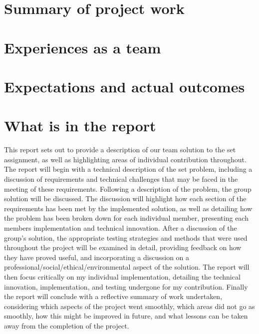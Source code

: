 \section{Summary of project work}

\section{Experiences as a team}
\section{Expectations and actual outcomes}
\section{What is in the report}
This report sets out to provide a description of our team solution to the set 
assignment, as well as highlighting areas of individual contribution throughout.
The report will begin with a technical description of the set problem, 
including a discussion of requirements and technical challenges that may be 
faced in the meeting of these requirements. 
Following a description of the problem, the group solution will be discussed. 
The discussion will highlight how each section of the requirements has been met 
by the implemented solution, as well as detailing how the problem has been broken 
down for each individual member, presenting each members implementation and 
technical innovation. 
After a discussion of the group's solution, the appropriate testing strategies 
and methods that were used throughout the project will be examined in detail, 
providing feedback on how they have proved useful, and incorporating a 
discussion on a professional/social/ethical/environmental aspect of the solution.
The report will then focus critically on my individual implementation, 
detailing the technical innovation, implementation, and testing undergone for my 
contribution. 
Finally the report will conclude with a reflective summary of work 
undertaken, considering which aspects of the project went smoothly, which areas
did not go as smoothly, how this might be improved in future, and what lessons 
can be taken away from the completion of the project. 
